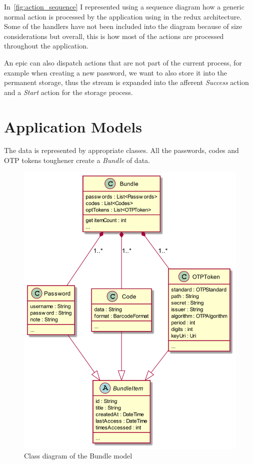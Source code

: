 \documentclass[a4paper,12pt]{report}
\begin{document}
In~\autoref{fig:action_sequence} I represented using a sequence diagram how a
generic normal action is processed by the application using in the redux
architecture. Some of the handlers have not been included into the diagram
because of size considerations but overall, this is how most of the actions are
processed throughout the application.

An epic can also dispatch actions that are not part of the current process, for
example when creating a new password, we want to also store it into the
permanent storage, thus the stream is expanded into the afferent
\textit{Success} action and a \textit{Start} action for the storage process.

\section{Application Models}

The data is represented by appropriate classes. All the passwords, codes and
OTP tokens toughener create a \textit{Bundle} of data.

\begin{figure}[H]
    \centering
    \includegraphics[scale=0.4]{diagrams/class/bundle.png}
    \caption{Class diagram of the Bundle model}\label{fig:bundle}
\end{figure}
\end{document}
